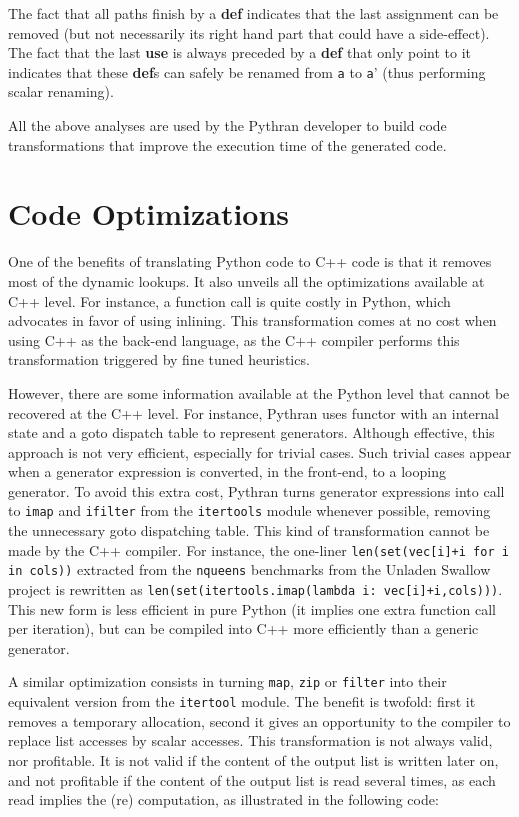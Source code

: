 \documentclass[10pt, onecolumn, preprint]{sigplanconf}
\begin{document}
The fact that all paths finish by a \textbf{def} indicates that the last
assignment can be removed (but not necessarily its right hand part that could
have a side-effect). The fact that the last \textbf{use} is always preceded by
a \textbf{def} that only point to it indicates that these \textbf{def}s can
safely be renamed from \texttt{a} to \texttt{a}' (thus performing scalar
renaming).

All the above analyses are used by the Pythran developer to build code
transformations that improve the execution time of the generated code.

\section{Code Optimizations}
\label{sec:optimizations}

One of the benefits of translating Python code to C++ code is that it removes
most of the dynamic lookups. It also unveils all the optimizations available at
C++ level. For instance, a function call is quite costly in Python, which
advocates in favor of using inlining. This transformation comes at no cost when
using C++ as the back-end language, as the C++ compiler performs this 
transformation triggered by fine tuned heuristics.

However, there are some information available at the Python level that cannot
be recovered at the C++ level. For instance, Pythran uses functor with an
internal state and a goto dispatch table to represent generators. Although
effective, this approach is not very efficient, especially for trivial cases.
Such trivial cases appear when a generator expression is converted, in the
front-end, to a looping generator. To avoid this extra cost, Pythran turns
generator expressions into call to \texttt{imap} and \texttt{ifilter} from the
\texttt{itertools} module whenever possible, removing the unnecessary goto
dispatching table. This kind of transformation cannot be made by the C++
compiler. For instance, the one-liner \texttt{len(set(vec[i]+i for i in cols))}
extracted from the \texttt{nqueens} benchmarks from the Unladen Swallow project
is rewritten as \texttt{len(set(itertools.imap(lambda i: vec[i]+i,cols)))}.
This new form is less efficient in pure Python (it implies one extra function
call per iteration), but can be compiled into C++ more efficiently than a
generic generator.

A similar optimization consists in turning \texttt{map}, \texttt{zip} or
\texttt{filter} into their equivalent version from the \texttt{itertool}
module. The benefit is twofold: first it removes a temporary allocation, second
it gives an opportunity to the compiler to replace list accesses by scalar
accesses. This transformation is not always valid, nor profitable. It is not
valid if the content of the output list is written later on, and not profitable
if the content of the output list is read several times, as each read implies
the (re) computation, as illustrated in the following code:
\end{document}
